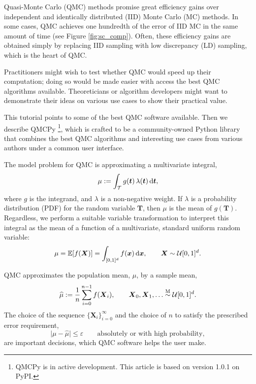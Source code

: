 \documentclass[graybox]{svmult}
\begin{document}
Quasi-Monte Carlo (QMC) methods promise great efficiency gains over independent and identically distributed (IID) Monte Carlo (MC) methods.  In some cases, QMC  achieves one hundredth of the error of IID MC in the same amount of time (see Figure \ref{fig:sc_comp}). Often, these efficiency gains are obtained simply by replacing IID sampling with low discrepancy (LD) sampling, which is the heart of QMC. 

Practitioners might wish to test whether QMC would speed up their computation; doing so would be made easier with access the best QMC algorithms available.  Theoreticians or algorithm developers might want to demonstrate their ideas on various use cases to show their practical value.  

This tutorial points to some of the best QMC software available.  Then we describe  QMCPy \cite{QMCPy2020a}\footnote{QMCPy is in active development. This article is based on version 1.0.1 on PyPI.}, which is crafted to be a community-owned Python library that combines the best QMC algorithms and interesting use cases from various authors under a common user interface.

The model problem for QMC is approximating a multivariate integral,
\begin{equation} \label{eq:integral}
	\mu := \int_\mathcal{T} g(\boldsymbol{t}) \, \lambda(\boldsymbol{t}) \, \D \boldsymbol{t},
\end{equation}
where $g$ is the integrand, and $\lambda$ is a non-negative weight.  If $\lambda$ is a probability distribution (PDF) for the random variable $\boldsymbol{T}$, then $\mu$ is the mean of $g(\boldsymbol{T})$.  Regardless, we perform a suitable variable transformation to interpret this integral as the  mean of a function of a multivariate, standard uniform random variable:
\begin{equation} \label{eq:fintegral}
	\mu = \mathbb{E}[f(\boldsymbol{X})] =  \int_{[0,1]^d}  f(\boldsymbol{x}) \,  \D \boldsymbol{x} , \qquad \boldsymbol{X} \sim \mathcal{U}[0,1]^d.
\end{equation}

QMC approximates the population mean, $\mu$,  by a sample mean,
\begin{equation} \label{eq:samplemean}
	\widehat{\mu} := \frac 1n \sum_{i=0}^{n-1} f(\boldsymbol{X}_i), \qquad \boldsymbol{X}_0, \boldsymbol{X}_1, \ldots \overset{\textup{M}}{\sim} \mathcal{U}[0,1]^d.
\end{equation}
The choice of the sequence $\{\boldsymbol{X}_i\}_{i=0}^\infty$ and the choice of $n$ to satisfy  the prescribed error requirement,
\begin{equation} \label{eq:err_req}
	\lvert\mu - \widehat{\mu}\rvert \le \varepsilon \qquad \text{absolutely or with high probability},
\end{equation} 
are important decisions, which  QMC software helps the user make.
\end{document}
